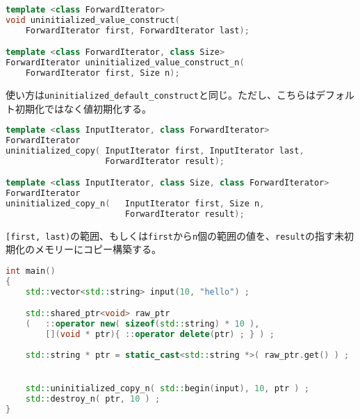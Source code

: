 %

\bgroup
\begin{lstlisting}[language=C++]
template <class ForwardIterator>
void uninitialized_value_construct(
    ForwardIterator first, ForwardIterator last);

template <class ForwardIterator, class Size>
ForwardIterator uninitialized_value_construct_n(
    ForwardIterator first, Size n);
\end{lstlisting}
\egroup

使い方は\lstinline!uninitialized_default_construct!と同じ。ただし、こちらはデフォルト初期化ではなく値初期化する。

%

\bgroup
\begin{lstlisting}[language=C++]
template <class InputIterator, class ForwardIterator>
ForwardIterator
uninitialized_copy( InputIterator first, InputIterator last,
                    ForwardIterator result);

template <class InputIterator, class Size, class ForwardIterator>
ForwardIterator
uninitialized_copy_n(   InputIterator first, Size n,
                        ForwardIterator result);
\end{lstlisting}
\egroup

\lstinline![first, last)!の範囲、もしくは\lstinline!first!から\lstinline!n!個の範囲の値を、\lstinline!result!の指す未初期化のメモリーにコピー構築する。

\begin{lstlisting}[language=C++]
int main()
{
    std::vector<std::string> input(10, "hello") ;

    std::shared_ptr<void> raw_ptr
    (   ::operator new( sizeof(std::string) * 10 ),
        [](void * ptr){ ::operator delete(ptr) ; } ) ;
 
    std::string * ptr = static_cast<std::string *>( raw_ptr.get() ) ;


    std::uninitialized_copy_n( std::begin(input), 10, ptr ) ;
    std::destroy_n( ptr, 10 ) ;
}
\end{lstlisting}

%

